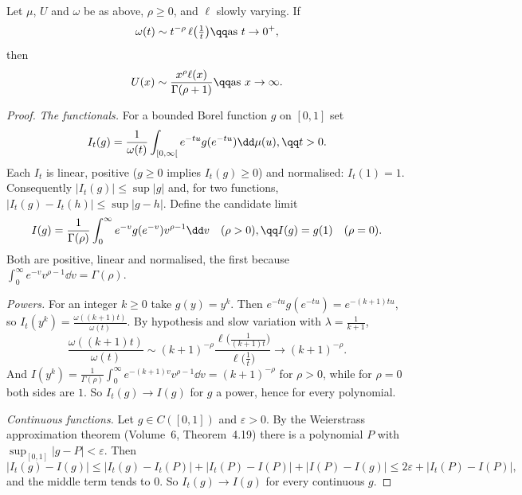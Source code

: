 \begin{theorem}\label{thm:karamata}
Let $\mu$, $U$ and $\omega$ be as above, $\rho\ge0$, and $\ell$ slowly varying. If
\[
\omega(t)\sim t^{-\rho}\,\ell\bigl(\tfrac1t\bigr)\qq\text{as }t\to0^+,
\]
then
\[
U(x)\sim\frac{x^\rho\ell(x)}{\Gamma(\rho+1)}\qq\text{as }x\to\infty.
\]
\end{theorem}
\begin{proof}
\emph{The functionals.} For a bounded Borel function $g$ on $[0,1]$ set
\[
I_t(g)=\frac1{\omega(t)}\int_{[0,\infty[}e^{-tu}g(e^{-tu})\dd\mu(u),\qq t>0.
\]
Each $I_t$ is linear, positive ($g\ge0$ implies $I_t(g)\ge0$) and normalised: $I_t(1)=1$. Consequently $|I_t(g)|\le\sup|g|$ and, for two functions,
$|I_t(g)-I_t(h)|\le\sup|g-h|$. Define the candidate limit
\[
I(g)=\frac1{\Gamma(\rho)}\int_0^\infty e^{-v}g(e^{-v})v^{\rho-1}\dd v\quad(\rho>0),\qq I(g)=g(1)\quad(\rho=0).
\]
Both are positive, linear and normalised, the first because $\int_0^\infty e^{-v}v^{\rho-1}\dd v=\Gamma(\rho)$.

\emph{Powers.} For an integer $k\ge0$ take $g(y)=y^k$. Then $e^{-tu}g(e^{-tu})=e^{-(k+1)tu}$, so $I_t(y^k)=\frac{\omega((k+1)t)}{\omega(t)}$. By hypothesis and
slow variation with $\lambda=\frac1{k+1}$,
\[
\frac{\omega((k+1)t)}{\omega(t)}\sim(k+1)^{-\rho}\frac{\ell\bigl(\frac1{(k+1)t}\bigr)}{\ell\bigl(\frac1t\bigr)}\longrightarrow(k+1)^{-\rho}.
\]
And $I(y^k)=\frac1{\Gamma(\rho)}\int_0^\infty e^{-(k+1)v}v^{\rho-1}\dd v=(k+1)^{-\rho}$ for $\rho>0$, while for $\rho=0$ both sides are $1$. So $I_t(g)\to I(g)$ for
$g$ a power, hence for every polynomial.

\emph{Continuous functions.} Let $g\in C([0,1])$ and $\varepsilon>0$. By the Weierstrass approximation theorem (Volume~6, Theorem~4.19) there is a polynomial $P$
with $\sup_{[0,1]}|g-P|<\varepsilon$. Then
\[
|I_t(g)-I(g)|\le|I_t(g)-I_t(P)|+|I_t(P)-I(P)|+|I(P)-I(g)|\le2\varepsilon+|I_t(P)-I(P)|,
\]
and the middle term tends to $0$. So $I_t(g)\to I(g)$ for every continuous $g$.


\end{proof}
